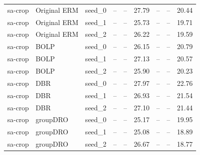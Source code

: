 \documentclass[11pt]{article}
\begin{document}
\begin{table}[h!]
{\begin{tabular}{lllcccccc}
\midrule

sa-crop & Original ERM & seed\_0 & -- & -- & 27.79 & -- & -- & 20.44 \\
sa-crop & Original ERM & seed\_1 & -- & -- & 25.73 & -- & -- & 19.71 \\
sa-crop & Original ERM & seed\_2 & -- & -- & 26.22 & -- & -- & 19.59 \\

sa-crop & BOLP & seed\_0 & -- & -- & 26.15 & -- & -- & 20.79 \\
sa-crop & BOLP & seed\_1 & -- & -- & 27.13 & -- & -- & 20.57 \\
sa-crop & BOLP & seed\_2 & -- & -- & 25.90 & -- & -- & 20.23 \\

sa-crop & DBR & seed\_0 & -- & -- & 27.97 & -- & -- & 22.76 \\
sa-crop & DBR & seed\_1 & -- & -- & 26.93 & -- & -- & 21.54 \\
sa-crop & DBR & seed\_2 & -- & -- & 27.10 & -- & -- & 21.44 \\

sa-crop & groupDRO & seed\_0 & -- & -- & 25.17 & -- & -- & 19.95 \\
sa-crop & groupDRO & seed\_1 & -- & -- & 25.08 & -- & -- & 18.89 \\
sa-crop & groupDRO & seed\_2 & -- & -- & 26.67 & -- & -- & 18.77 \\

\bottomrule
\end{tabular}%
}
\end{table}



\end{document}
